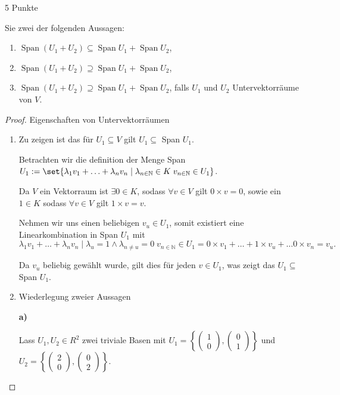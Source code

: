 \documentclass{../problemset}
\begin{document}
\begin{problem}{5 Punkte}
\begin{enumerate}
	      Sie zwei der folgenden Aussagen:
	      \begin{enumerate}[label=\alph*)]
		      \item $\operatorname{Span}(U_1 + U_2) \subseteq \operatorname{Span} U_1 + \operatorname{Span} U_2$,
		      \item $\operatorname{Span}(U_1 + U_2) \supseteq \operatorname{Span} U_1 + \operatorname{Span} U_2$,
		      \item $\operatorname{Span}(U_1 + U_2) \supseteq \operatorname{Span} U_1 + \operatorname{Span} U_2$, falls $U_1$ und $U_2$ Untervektorräume von $V$.
	      \end{enumerate}
\end{enumerate}
\begin{proof}
	Eigenschaften von Untervektorräumen
	\begin{enumerate}
		\item Zu zeigen ist das für $U_1 \subseteq V$ gilt $U_1 \subseteq$ Span $U_1$.

		      Betrachten wir die definition der Menge Span $U_1 := \set{\lambda_1 v_1 + \ldots + \lambda_n v_n \mid \lambda_{n \in \mathbb{N}} \in K \; v_{n \in \mathbb{N}} \in U_1}$.

		      Da $V$ ein Vektorraum ist $\exists 0 \in K$, sodass $\forall v \in V$ gilt $0 \times v = 0$, sowie ein $1 \in K$ sodass $\forall v \in V$ gilt $1 \times v = v$.

		      Nehmen wir uns einen beliebigen $v_u \in U_1$, somit existiert eine Linearkombination in Span $U_1$ mit \[
			      \lambda_1 v_1 + \ldots + \lambda_n v_n \mid \lambda_u = 1 \land \lambda_{n \ne u} = 0 \; v_{n \in \mathbb{N}} \in U_1 = 0 \times v_1 + \ldots + 1 \times v_u + \ldots 0 \times v_n = v_u.
		      \]

		      Da \(v_u\) beliebig gewählt wurde, gilt dies für jeden \(v \in U_1\), was zeigt das $U_1 \subseteq$ Span $U_1$. \checkmark
		\item Wiederlegung zweier Aussagen

		      \textbf{a)}

		      Lass \(U_1, U_2 \in R^2\) zwei triviale Basen mit \(U_1 = \left\{\begin{pmatrix}
			      1 \\ 0
		      \end{pmatrix},
		      \begin{pmatrix}
			      0 \\ 1
		      \end{pmatrix}\right\}\) und \(U_2 = \left\{\begin{pmatrix}
			      2 \\ 0
		      \end{pmatrix},
		      \begin{pmatrix}
			      0 \\ 2
		      \end{pmatrix}\right\}\).


\end{enumerate}
\end{proof}
\end{problem}
\end{document}
